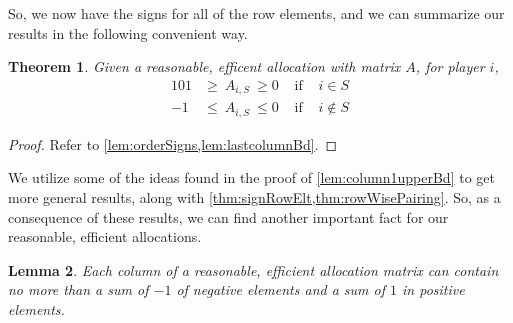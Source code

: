 \documentclass[12pt,letterpaper,final]{article}
\theoremstyle{plain}
\newtheorem{theorem}{Theorem}[section]
\theoremstyle{plain}
\theoremstyle{plain}
\newtheorem{lemma}[theorem]{Lemma}
\theoremstyle{plain}
\theoremstyle{plain}
\theoremstyle{plain}
\theoremstyle{plain}
\theoremstyle{definition}
\theoremstyle{definition}
\theoremstyle{definition}
\theoremstyle{definition}
\theoremstyle{definition}
\theoremstyle{remark}
\theoremstyle{remark}
\theoremstyle{remark}
\theoremstyle{remark}
\begin{document}
So, we now have the signs for all of the row elements, and we can
summarize our results in the following convenient way.

\begin{theorem}\label{thm:signRowElt}
  Given a reasonable, efficent allocation with matrix \(A\), for player \(i\),
  \begin{alignat*}{10}
    1 &\geq~A_{i,S}~\geq 0 &\text{ if } &i\in S \\
    -1 &\leq~A_{i,S}~\leq 0 &\text{ if } &i\notin S
  \end{alignat*}
\end{theorem}

\begin{proof}
  Refer to \cref{lem:orderSigns,lem:lastcolumnBd}.
\end{proof}

We utilize some of the ideas found in the proof of \cref{lem:column1upperBd} to get
more general results, along with
\cref{thm:signRowElt,thm:rowWisePairing}. So, as a consequence of
these results, we can find another important fact for our reasonable, efficient allocations.









\begin{lemma}\label{cor:colsum1}
  Each column of a reasonable, efficient allocation matrix can contain no
  more than a sum of \(-1\) of negative elements and a sum of \(1\) in
  positive elements.
\end{lemma}
\end{document}
